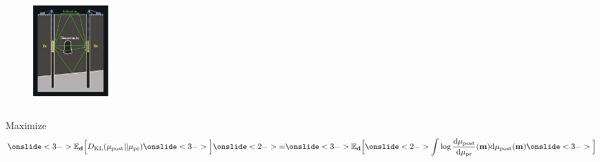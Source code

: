 \documentclass{beamer}
\begin{document}
\begin{frame}
\begin{columns}
\begin{column}{0.5\textwidth}
      \begin{figure}
        \centering
        \includegraphics[width=\linewidth, height=3.5cm]{figs/borehole.png}
      \end{figure}
      
    \end{column}
  \end{columns}
\end{frame}



\begin{frame}
  Maximize 
  \begin{equation*}
    \onslide<3->{\mathbb{E}_{\data} \Big [}D_{\text{KL}} (\post || \pr ) \onslide<3->{\Big ]}
    \onslide<2->{=} \onslide<3->{\mathbb{E}_{\data} \Big [}\onslide<2->{\int \log \frac{\der \post}{\der \pr}(\param) \der \post(\param)}  \onslide<3->{\Big ]}
  \end{equation*}




  
\end{frame}
\end{document}
